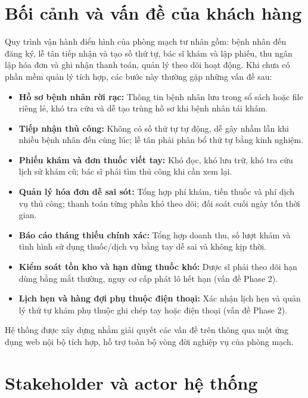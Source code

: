 \section{Bối cảnh và vấn đề của khách hàng}
\label{sec:srs-context}

Quy trình vận hành điển hình của phòng mạch tư nhân gồm: bệnh nhân đến đăng ký, lễ tân tiếp nhận và tạo số thứ tự, bác sĩ khám và lập phiếu, thu ngân lập hóa đơn và ghi nhận thanh toán, quản lý theo dõi hoạt động. Khi chưa có phần mềm quản lý tích hợp, các bước này thường gặp những vấn đề sau:

\begin{itemize}
    \item \textbf{Hồ sơ bệnh nhân rời rạc:} Thông tin bệnh nhân lưu trong sổ sách hoặc file riêng lẻ, khó tra cứu và dễ tạo trùng hồ sơ khi bệnh nhân tái khám.
    \item \textbf{Tiếp nhận thủ công:} Không có số thứ tự tự động, dễ gây nhầm lẫn khi nhiều bệnh nhân đến cùng lúc; lễ tân phải phân bổ thứ tự bằng kinh nghiệm.
    \item \textbf{Phiếu khám và đơn thuốc viết tay:} Khó đọc, khó lưu trữ, khó tra cứu lịch sử khám cũ; bác sĩ phải tìm thủ công khi cần xem lại.
    \item \textbf{Quản lý hóa đơn dễ sai sót:} Tổng hợp phí khám, tiền thuốc và phí dịch vụ thủ công; thanh toán từng phần khó theo dõi; đối soát cuối ngày tốn thời gian.
    \item \textbf{Báo cáo tháng thiếu chính xác:} Tổng hợp doanh thu, số lượt khám và tình hình sử dụng thuốc/dịch vụ bằng tay dễ sai và không kịp thời.
    \item \textbf{Kiểm soát tồn kho và hạn dùng thuốc khó:} Dược sĩ phải theo dõi hạn dùng bằng mắt thường, nguy cơ cấp phát lô hết hạn (vấn đề Phase 2).
    \item \textbf{Lịch hẹn và hàng đợi phụ thuộc điện thoại:} Xác nhận lịch hẹn và quản lý thứ tự khám phụ thuộc ghi chép tay hoặc điện thoại (vấn đề Phase 2).
\end{itemize}

Hệ thống \projecttitle{} được xây dựng nhằm giải quyết các vấn đề trên thông qua một ứng dụng web nội bộ tích hợp, hỗ trợ toàn bộ vòng đời nghiệp vụ của phòng mạch.

\section{Stakeholder và actor hệ thống}
\label{sec:srs-stakeholder}

